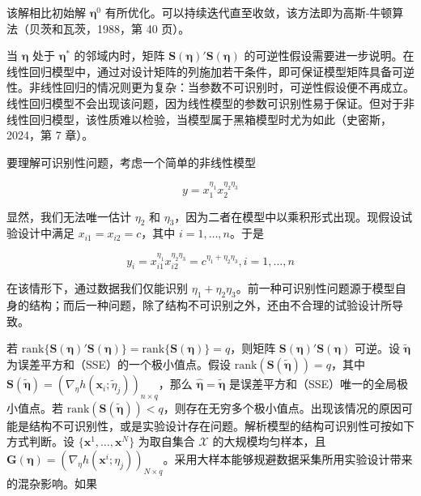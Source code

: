 \documentclass{ctexart}
\begin{document}
该解相比初始解 $\boldsymbol{\eta}^0$ 有所优化。可以持续迭代直至收敛，该方法即为高斯‑牛顿算法（贝茨和瓦茨，1988，第 40 页）。

当 $\boldsymbol{\eta}$ 处于 $\boldsymbol{\eta}^*$ 的邻域内时，矩阵 $\boldsymbol{S}(\boldsymbol{\eta})'\boldsymbol{S}(\boldsymbol{\eta})$ 的可逆性假设需要进一步说明。在线性回归模型中，通过对设计矩阵的列施加若干条件，即可保证模型矩阵具备可逆性。非线性回归的情况则更为复杂：当参数不可识别时，可逆性假设便不再成立。线性回归模型不会出现该问题，因为线性模型的参数可识别性易于保证。但对于非线性回归模型，该性质难以检验，当模型属于黑箱模型时尤为如此（史密斯，2024，第 7 章）。

要理解可识别性问题，考虑一个简单的非线性模型

\begin{equation*}
y=x_1^{\eta_1}x_2^{\eta_2\eta_3}
\end{equation*}

显然，我们无法唯一估计 $\eta_2$ 和 $\eta_3$，因为二者在模型中以乘积形式出现。现假设试验设计中满足 $x_{i1}=x_{i2}=c$，其中 $i=1,\dots,n$。于是

\begin{equation*}
y_i=x_{i1}^{\eta_1}x_{i2}^{\eta_2\eta_3}=c^{\eta_1+\eta_2\eta_3},i=1,\dots,n
\end{equation*}

在该情形下，通过数据我们仅能识别 $\eta_1+\eta_2\eta_3$。前一种可识别性问题源于模型自身的结构；而后一种问题，除了结构不可识别之外，还由不合理的试验设计所导致。

若 $\mathrm{rank}\{\boldsymbol{S}(\boldsymbol{\eta})'\boldsymbol{S}(\boldsymbol{\eta})\}=\mathrm{rank}\{\boldsymbol{S}(\boldsymbol{\eta})\}=q$，则矩阵 $\boldsymbol{S}(\boldsymbol{\eta})'\boldsymbol{S}(\boldsymbol{\eta})$ 可逆。设 $\widetilde{\boldsymbol{\eta}}$ 为误差平方和（SSE）的一个极小值点。假设 $\mathrm{rank}(\boldsymbol{S}(\widetilde{\boldsymbol{\eta}}))=q$，其中 $\boldsymbol{S}(\widetilde{\boldsymbol{\eta}})=(\nabla_{\eta}h(\boldsymbol{x}_i;\widetilde{\eta}_j))_{n\times q}$，那么 $\widehat{\boldsymbol{\eta}}=\widetilde{\boldsymbol{\eta}}$ 是误差平方和（SSE）唯一的全局极小值点。若 $\mathrm{rank}(\boldsymbol{S}(\widetilde{\boldsymbol{\eta}}))<q$，则存在无穷多个极小值点。出现该情况的原因可能是结构不可识别性，或是实验设计存在问题。解析模型的结构可识别性可按如下方式判断。设 $\{\boldsymbol{x}^1,\dots,\boldsymbol{x}^N\}$ 为取自集合 $\mathcal{X}$ 的大规模均匀样本，且 $\boldsymbol{G}(\boldsymbol{\eta})=(\nabla_{\eta}h(\boldsymbol{x}^i;\eta_j))_{N\times q}$。采用大样本能够规避数据采集所用实验设计带来的混杂影响。如果
\end{document}
